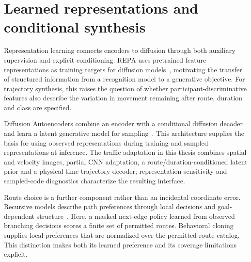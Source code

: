 \section{Learned representations and conditional synthesis}
Representation learning connects encoders to diffusion through both auxiliary supervision and explicit conditioning. REPA uses pretrained feature representations as training targets for diffusion models~\cite{repa}, motivating the transfer of structured information from a recognition model to a generative objective. For trajectory synthesis, this raises the question of whether participant-discriminative features also describe the variation in movement remaining after route, duration and class are specified.

Diffusion Autoencoders combine an encoder with a conditional diffusion decoder and learn a latent generative model for sampling~\cite{diffae}. This architecture supplies the basis for using observed representations during training and sampled representations at inference. The traffic adaptation in this thesis combines spatial and velocity images, partial CNN adaptation, a route/duration-conditioned latent prior and a physical-time trajectory decoder; representation sensitivity and sampled-code diagnostics characterize the resulting interface.

Route choice is a further component rather than an incidental coordinate error. Recursive models describe path preferences through local decisions and goal-dependent structure~\cite{routechoice}. Here, a masked next-edge policy learned from observed branching decisions scores a finite set of permitted routes. Behavioral cloning supplies local preferences that are normalized over the permitted route catalog. This distinction makes both its learned preference and its coverage limitations explicit.


